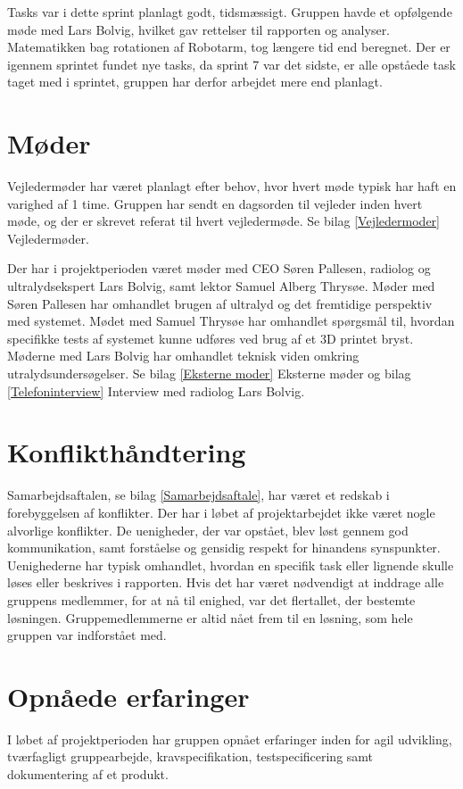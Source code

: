 Tasks var i dette sprint planlagt godt, tidsmæssigt. Gruppen havde et opfølgende møde med Lars Bolvig, hvilket gav rettelser til rapporten og analyser. Matematikken bag rotationen af Robotarm, tog længere tid end beregnet. Der er igennem sprintet fundet nye tasks, da sprint 7 var det sidste, er alle opståede task taget med i sprintet, gruppen har derfor arbejdet mere end planlagt. 
 
\section{Møder}
Vejledermøder har været planlagt efter behov, hvor hvert møde typisk har haft en varighed af 1 time. Gruppen har sendt en dagsorden til vejleder inden hvert møde, og der er skrevet referat til hvert vejledermøde. Se bilag \ref{Vejledermoder} Vejledermøder.
 
Der har i projektperioden været møder med CEO Søren Pallesen, radiolog og ultralydsekspert Lars Bolvig, samt lektor Samuel Alberg Thrysøe. Møder med Søren Pallesen har omhandlet brugen af ultralyd og det fremtidige perspektiv med systemet. Mødet med Samuel Thrysøe har omhandlet spørgsmål til, hvordan specifikke tests af systemet kunne udføres ved brug af et 3D printet bryst. Møderne med Lars Bolvig har omhandlet teknisk viden omkring utralydsundersøgelser. Se bilag \ref{Eksterne moder} Eksterne møder og bilag \ref{Telefoninterview} Interview med radiolog Lars Bolvig. 

\section{Konflikthåndtering}
Samarbejdsaftalen, se bilag \ref{Samarbejdsaftale}, har været et redskab i forebyggelsen af konflikter. Der har i løbet af projektarbejdet ikke været nogle alvorlige konflikter. De uenigheder, der var opstået, blev løst gennem god kommunikation, samt forståelse og gensidig respekt for hinandens synspunkter. Uenighederne har typisk omhandlet, hvordan en specifik task eller lignende skulle løses eller beskrives i rapporten. Hvis det har været nødvendigt at inddrage alle gruppens medlemmer, for at nå til enighed, var det flertallet, der bestemte løsningen. Gruppemedlemmerne er altid nået frem til en løsning, som hele gruppen var indforstået med.

\section{Opnåede erfaringer}
I løbet af projektperioden har gruppen opnået erfaringer inden for agil udvikling, tværfagligt gruppearbejde, kravspecifikation, testspecificering samt dokumentering af et produkt.

